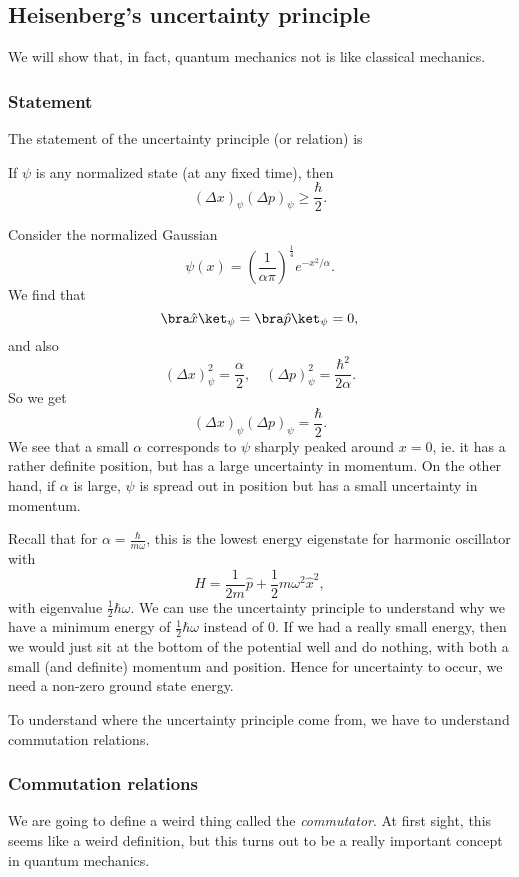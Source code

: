 \documentclass[a4paper]{article}
\begin{document}
\subsection{Heisenberg's uncertainty principle}
We will show that, in fact, quantum mechanics not is like classical mechanics.

\subsubsection*{Statement}
The statement of the uncertainty principle (or relation) is
\begin{thm}
  If $\psi$ is any normalized state (at any fixed time), then
  \[
    (\Delta x)_\psi (\Delta p)_\psi \geq \frac{\hbar}{2}.
  \]
\end{thm}

\begin{eg}
  Consider the normalized Gaussian
  \[
    \psi(x) = \left(\frac{1}{\alpha \pi}\right)^{\frac{1}{4}} e^{-x^2/\alpha}.
  \]
  We find that
  \[
    \bra \hat{x}\ket_\psi = \bra \hat{p}\ket_\psi = 0,
  \]
  and also
  \[
    (\Delta x)_\psi^2 = \frac{\alpha}{2},\quad (\Delta p)_\psi^2 = \frac{\hbar^2}{2\alpha}.
  \]
  So we get
  \[
    (\Delta x)_\psi(\Delta p)_\psi = \frac{\hbar}{2}.
  \]
  We see that a small $\alpha$ corresponds to $\psi$ sharply peaked around $x = 0$, ie. it has a rather definite position, but has a large uncertainty in momentum. On the other hand, if $\alpha$ is large, $\psi$ is spread out in position but has a small uncertainty in momentum.
\end{eg}
Recall that for $\alpha = \frac{\hbar}{m\omega}$, this is the lowest energy eigenstate for harmonic oscillator with
\[
  H = \frac{1}{2m}\hat{p} + \frac{1}{2}m\omega^2 \hat{x}^2,
\]
with eigenvalue $\frac{1}{2}\hbar \omega$. We can use the uncertainty principle to understand why we have a minimum energy of $\frac{1}{2}\hbar \omega$ instead of $0$. If we had a really small energy, then we would just sit at the bottom of the potential well and do nothing, with both a small (and definite) momentum and position. Hence for uncertainty to occur, we need a non-zero ground state energy.

To understand where the uncertainty principle come from, we have to understand commutation relations.
\subsubsection*{Commutation relations}
We are going to define a weird thing called the \emph{commutator}. At first sight, this seems like a weird definition, but this turns out to be a really important concept in quantum mechanics.
\end{document}
